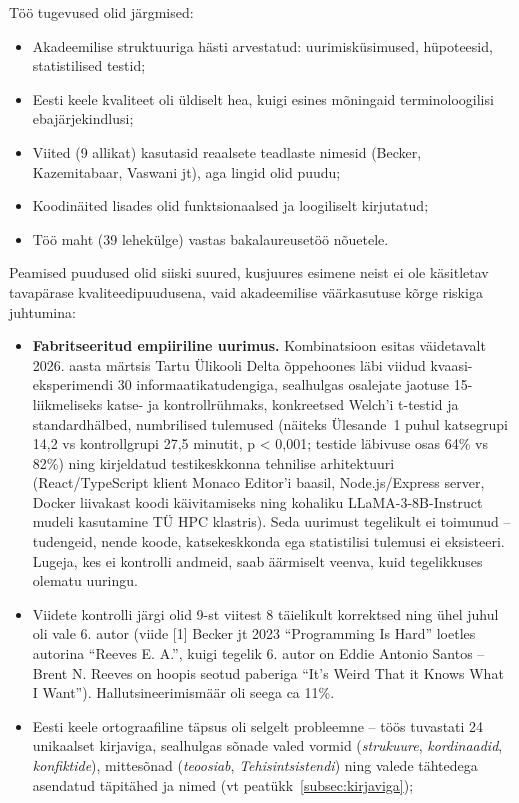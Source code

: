 Töö tugevused olid järgmised:
\begin{itemize}
    \item Akadeemilise struktuuriga hästi arvestatud: uurimisküsimused, hüpoteesid, statistilised testid;
    \item Eesti keele kvaliteet oli üldiselt hea, kuigi esines mõningaid terminoloogilisi ebajärjekindlusi;
    \item Viited (9 allikat) kasutasid reaalsete teadlaste nimesid (Becker, Kazemitabaar, Vaswani jt), aga lingid olid puudu;
    \item Koodinäited lisades olid funktsionaalsed ja loogiliselt kirjutatud;
    \item Töö maht (39 lehekülge) vastas bakalaureusetöö nõuetele.
\end{itemize}

Peamised puudused olid siiski suured, kusjuures esimene neist ei ole käsitletav tavapärase kvaliteedipuudusena, vaid akadeemilise väärkasutuse kõrge riskiga juhtumina:
\begin{itemize}
    \item \textbf{Fabritseeritud empiiriline uurimus.} Kombinatsioon esitas väidetavalt 2026. aasta märtsis Tartu Ülikooli Delta õppehoones läbi viidud kvaasi-eksperimendi 30 informaatikatudengiga, sealhulgas osalejate jaotuse 15-liikmeliseks katse- ja kontrollrühmaks, konkreetsed Welch'i t-testid ja standardhälbed, numbrilised tulemused (näiteks Ülesande~1 puhul katsegrupi 14,2 vs kontrollgrupi 27,5 minutit, p < 0{,}001; testide läbivuse osas 64\% vs 82\%) ning kirjeldatud testikeskkonna tehnilise arhitektuuri (React/TypeScript klient Monaco Editor'i baasil, Node.js/Express server, Docker liivakast koodi käivitamiseks ning kohaliku LLaMA-3-8B-Instruct mudeli kasutamine TÜ HPC klastris). Seda uurimust tegelikult ei toimunud -- tudengeid, nende koode, katsekeskkonda ega statistilisi tulemusi ei eksisteeri. Lugeja, kes ei kontrolli andmeid, saab äärmiselt veenva, kuid tegelikkuses olematu uuringu.
    \item Viidete kontrolli järgi olid 9-st viitest 8 täielikult korrektsed ning ühel juhul oli vale 6. autor (viide [1] Becker jt 2023 ``Programming Is Hard'' loetles autorina ``Reeves E. A.'', kuigi tegelik 6. autor on Eddie Antonio Santos -- Brent N. Reeves on hoopis seotud paberiga ``It's Weird That it Knows What I Want''). Hallutsineerimismäär oli seega ca 11\%.
    \item Eesti keele ortograafiline täpsus oli selgelt probleemne -- töös tuvastati 24 unikaalset kirjaviga, sealhulgas sõnade valed vormid (\textit{strukuure}, \textit{kordinaadid}, \textit{konfiktide}), mittesõnad (\textit{teoosiab}, \textit{Tehisintsistendi}) ning valede tähtedega asendatud täpitähed ja nimed (vt peatükk~\ref{subsec:kirjaviga});
\end{itemize}


